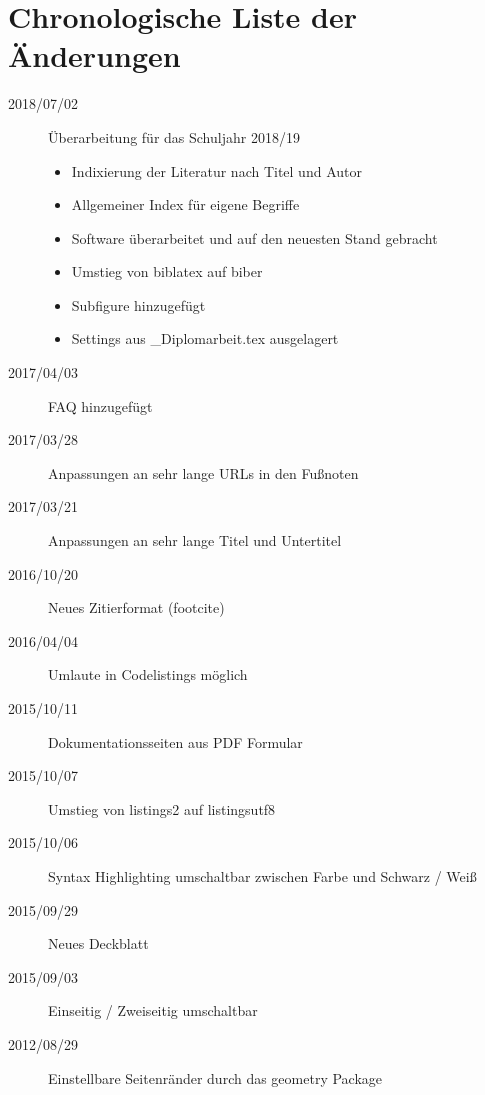 \chapter{Chronologische Liste der Änderungen}

\begin{sloppypar}
\begin{description}

\item[2018/07/02]
Überarbeitung für das Schuljahr 2018/19
\begin{itemize}
  \item Indixierung der Literatur nach Titel und Autor
  \item Allgemeiner Index für eigene Begriffe
  \item Software überarbeitet und auf den neuesten Stand gebracht
  \item Umstieg von biblatex auf biber
  \item Subfigure hinzugefügt
  \item Settings aus \_Diplomarbeit.tex ausgelagert
\end{itemize}


\item[2017/04/03]
FAQ hinzugefügt

\item[2017/03/28]
Anpassungen an sehr lange URLs in den Fußnoten

\item[2017/03/21]
Anpassungen an sehr lange Titel und Untertitel

\item[2016/10/20]
Neues Zitierformat (footcite)

\item[2016/04/04]
Umlaute in Codelistings möglich

\item[2015/10/11]
Dokumentationsseiten aus PDF Formular

\item[2015/10/07]
Umstieg von listings2 auf listingsutf8

\item[2015/10/06]
Syntax Highlighting umschaltbar zwischen Farbe und Schwarz / Weiß

\item[2015/09/29]
Neues Deckblatt

\item[2015/09/03]
Einseitig / Zweiseitig umschaltbar 

\item[2012/08/29]
Einstellbare Seitenränder durch das geometry Package


\end{description}
\end{sloppypar}
